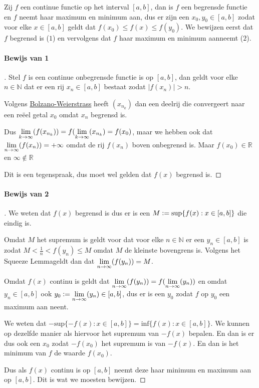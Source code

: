 
Zij $f$ een continue functie op het interval $[a,b]$, dan is $f$ een begrensde functie en $f$ neemt haar maximum en minimum aan, dus er zijn een $x_{0},y_{0}\in [a,b]$ zodat voor elke $x\in [a,b]$ geldt dat $f(x_{0}) \leq f(x) \leq f(y_{0})$. We bewijzen eerst dat $f$ begrensd is ($1$) en vervolgens dat $f$ haar maximum en minimum aanneemt ($2$).

\paragraph{Bewijs van 1}

\begin{proof}[\unskip\nopunct]

Stel $f$ is een continue onbegrensde functie is op $[a,b]$, dan geldt voor elke $n\in\mathbb{N}$ dat er een rij $x_{n}\in[a,b]$ bestaat zodat $|f(x_{n})|>n$. \bigskip

\noindent Volgens \hyperref[sec:AC]{Bolzano-Weierstrass} heeft $(x_{n_{k}})$ dan een deelrij die convergeert naar een reëel getal $x_{0}$ omdat $x_{n}$ begrensd is. \bigskip

\noindent Dus $\underset{k\to\infty}{\text{lim}}(f(x_{n_{k}}))=f(\underset{k\to\infty}{\text{lim}}(x_{n_{k}})=f(x_{0})$, maar we hebben ook dat $\underset{n\to\infty}{\text{lim}}(f(x_{n}))=+\infty$ omdat de rij $f(x_{n})$ boven onbegrensd is. Maar $f(x_{0})\in\mathbb{R}$ en $\infty\notin\mathbb{R}$ \bigskip

\noindent Dit is een tegenspraak, dus moet wel gelden dat $f(x)$ begrensd is.

\end{proof}

\paragraph{Bewijs van 2}

\begin{proof}[\unskip\nopunct]

We weten dat $f(x)$ begrensd is dus er is een $M\vcentcolon=\text{sup}\{f(x):x\in[a,b]\}$ die eindig is. \bigskip

\noindent Omdat $M$ het supremum is geldt voor dat voor elke $n\in\mathbb{N}$ er een $y_{n}\in[a,b]$ is zodat $M < \frac{1}{n}<f(y_{n}) \leq M$ omdat $M$ de kleinste bovengrens is. Volgens het \bq Squeeze Lemma\eq geldt dan dat $\underset{n\to\infty}{\text{lim}}(f(y_{n}))=M$. \bigskip

\noindent Omdat $f(x)$ continu is geldt dat $\underset{n\to\infty}{\text{lim}}(f(y_{n}))=f(\underset{n\to\infty}{\text{lim}}(y_{n}))$ en omdat $y_{n}\in[a,b]$ ook $y_{0}\vcentcolon=\underset{n\to\infty}{\text{lim}}(y_{n})\in[a,b]$, dus er is een $y_{0}$ zodat $f$ op $y_{0}$ een maximum aan neent. \bigskip

\noindent We weten dat $-\text{sup}\{-f(x):x\in[a,b]\}=\text{inf}\{f(x):x\in[a,b]\}$. We kunnen op dezelfde manier als hiervoor het supremum van $-f(x)$ bepalen. En dan is er dus ook een $x_{0}$ zodat $-f(x_{0})$ het supremum is van $-f(x)$. En dan is het minimum van $f$ de waarde $f(x_{0})$. \bigskip

\noindent Dus als $f(x)$ continu is op $[a,b]$ neemt deze haar minimum en maximum aan op $[a,b]$. Dit is wat we moesten bewijzen.

\end{proof}